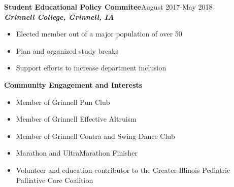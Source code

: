 \documentclass[9pt]{extarticle}
\begin{document}
\textbf{Student Educational Policy Commitee}\hfill August 2017-May 2018\\
\textbf{\textit{Grinnell College, Grinnell, IA}}
\begin{itemize}
\item Elected member out of a major population of over 50
\item Plan and organized study breaks
\item Support efforts to increase department inclusion
\end{itemize}



\begin{large}
\begin{center}\textbf{Community Engagement and Interests}
\end{center}
\end{large}
\begin{itemize}
\item Member of Grinnell Pun Club
\item Member of Grinnell Effective Altruism
\item Member of Grinnell Contra and Swing Dance Club
\item Marathon and UltraMarathon Finisher
\item Volunteer and education contributor to the Greater Illinois
  Pediatric Palliative Care Coalition
\end{itemize}
\end{document}
